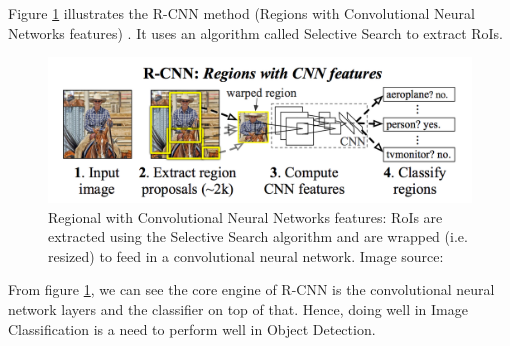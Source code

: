 Figure \ref{fig:rcnn} illustrates the R-CNN method (Regions with Convolutional Neural Networks features) \cite{DBLP:journals/corr/GirshickDDM13}. It uses an algorithm called Selective Search \cite{Uijlings:2013:SSO:2509349.2509382} to extract RoIs.
\begin{figure}[tb]
	\centering
	\includegraphics[width=1.0\hsize]{./figures/rcnn}
	\caption{Regional with Convolutional Neural Networks features: RoIs are extracted using the Selective Search algorithm \cite{Uijlings:2013:SSO:2509349.2509382} and are wrapped (i.e. resized) to feed in a convolutional neural network. Image source: \cite{DBLP:journals/corr/GirshickDDM13}}
	\label{fig:rcnn}
\end{figure}
From figure \ref{fig:rcnn}, we can see the core engine of R-CNN is the convolutional neural network layers and the classifier on top of that. Hence, doing well in Image Classification is a need to perform well in Object Detection.

